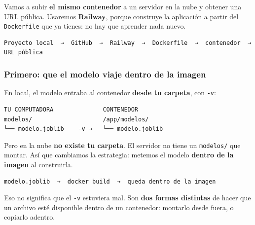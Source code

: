 \documentclass[
]{article}
\begin{document}
Vamos a subir \textbf{el mismo contenedor} a un servidor en la nube y
obtener una URL pública. Usaremos \textbf{Railway}, porque construye la
aplicación a partir del \texttt{Dockerfile} que ya tienes: no hay que
aprender nada nuevo.

\begin{verbatim}
Proyecto local  →  GitHub  →  Railway  →  Dockerfile  →  contenedor  →  URL pública
\end{verbatim}

\protect{}\label{ZD6k47WHnYyd}
\subsubsection{Primero: que el modelo viaje dentro de la
imagen}\label{primero-que-el-modelo-viaje-dentro-de-la-imagen}

En local, el modelo entraba al contenedor \textbf{desde tu carpeta}, con
\texttt{-v}:

\begin{verbatim}
TU COMPUTADORA              CONTENEDOR
modelos/                    /app/modelos/
└── modelo.joblib    -v →   └── modelo.joblib
\end{verbatim}

Pero en la nube \textbf{no existe tu carpeta}. El servidor no tiene un
\texttt{modelos/} que montar. Así que cambiamos la estrategia: metemos
el modelo \textbf{dentro de la imagen} al construirla.

\begin{verbatim}
modelo.joblib  →  docker build  →  queda dentro de la imagen
\end{verbatim}

Eso no significa que el \texttt{-v} estuviera mal. Son \textbf{dos
formas distintas} de hacer que un archivo esté disponible dentro de un
contenedor: montarlo desde fuera, o copiarlo adentro.
\end{document}
